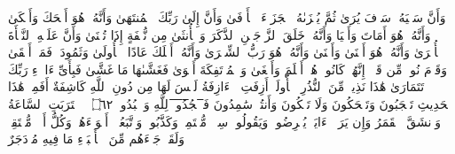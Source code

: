 \stopbuffer%
\startbuffer[\q:53:40]
وَأَنَّ سَعۡیَهُۥ سَوۡفَ یُرَىٰ%
\stopbuffer%
\startbuffer[\q:53:41]
ثُمَّ یُجۡزَىٰهُ ٱلۡجَزَاۤءَ ٱلۡأَوۡفَىٰ%
\stopbuffer%
\startbuffer[\q:53:42]
وَأَنَّ إِلَىٰ رَبِّكَ ٱلۡمُنتَهَىٰ%
\stopbuffer%
\startbuffer[\q:53:43]
وَأَنَّهُۥ هُوَ أَضۡحَكَ وَأَبۡكَىٰ%
\stopbuffer%
\startbuffer[\q:53:44]
وَأَنَّهُۥ هُوَ أَمَاتَ وَأَحۡیَا%
\stopbuffer%
\startbuffer[\q:53:45]
وَأَنَّهُۥ خَلَقَ ٱلزَّوۡجَیۡنِ ٱلذَّكَرَ وَٱلۡأُنثَىٰ%
\stopbuffer%
\startbuffer[\q:53:46]
مِن نُّطۡفَةٍ إِذَا تُمۡنَىٰ%
\stopbuffer%
\startbuffer[\q:53:47]
وَأَنَّ عَلَیۡهِ ٱلنَّشۡأَةَ ٱلۡأُخۡرَىٰ%
\stopbuffer%
\startbuffer[\q:53:48]
وَأَنَّهُۥ هُوَ أَغۡنَىٰ وَأَقۡنَىٰ%
\stopbuffer%
\startbuffer[\q:53:49]
وَأَنَّهُۥ هُوَ رَبُّ ٱلشِّعۡرَىٰ%
\stopbuffer%
\startbuffer[\q:53:50]
وَأَنَّهُۥۤ أَهۡلَكَ عَادًا ٱلۡأُولَىٰ%
\stopbuffer%
\startbuffer[\q:53:51]
وَثَمُودَا۟ فَمَاۤ أَبۡقَىٰ%
\stopbuffer%
\startbuffer[\q:53:52]
وَقَوۡمَ نُوحࣲ مِّن قَبۡلُۖ إِنَّهُمۡ كَانُوا۟ هُمۡ أَظۡلَمَ وَأَطۡغَىٰ%
\stopbuffer%
\startbuffer[\q:53:53]
وَٱلۡمُؤۡتَفِكَةَ أَهۡوَىٰ%
\stopbuffer%
\startbuffer[\q:53:54]
فَغَشَّىٰهَا مَا غَشَّىٰ%
\stopbuffer%
\startbuffer[\q:53:55]
فَبِأَیِّ ءَالَاۤءِ رَبِّكَ تَتَمَارَىٰ%
\stopbuffer%
\startbuffer[\q:53:56]
هَٰذَا نَذِیرࣱ مِّنَ ٱلنُّذُرِ ٱلۡأُولَىٰۤ%
\stopbuffer%
\startbuffer[\q:53:57]
أَزِفَتِ ٱلۡءَازِفَةُ%
\stopbuffer%
\startbuffer[\q:53:58]
لَیۡسَ لَهَا مِن دُونِ ٱللَّهِ كَاشِفَةٌ%
\stopbuffer%
\startbuffer[\q:53:59]
أَفَمِنۡ هَٰذَا ٱلۡحَدِیثِ تَعۡجَبُونَ%
\stopbuffer%
\startbuffer[\q:53:60]
وَتَضۡحَكُونَ وَلَا تَبۡكُونَ%
\stopbuffer%
\startbuffer[\q:53:61]
وَأَنتُمۡ سَٰمِدُونَ%
\stopbuffer%
\startbuffer[\q:53:62]
فَ̅ٱ̅سۡ̅جُ̅دُ̅و̅ا۟̅ لِلَّهِ وَٱعۡبُدُوا۟ ۝٦٢ ۩%
\stopbuffer%
\startbuffer[\q:54:1]
ٱقۡتَرَبَتِ ٱلسَّاعَةُ وَٱنشَقَّ ٱلۡقَمَرُ%
\stopbuffer%
\startbuffer[\q:54:2]
وَإِن یَرَوۡا۟ ءَایَةࣰ یُعۡرِضُوا۟ وَیَقُولُوا۟ سِحۡرࣱ مُّسۡتَمِرࣱّ%
\stopbuffer%
\startbuffer[\q:54:3]
وَكَذَّبُوا۟ وَٱتَّبَعُوۤا۟ أَهۡوَاۤءَهُمۡۚ وَكُلُّ أَمۡرࣲ مُّسۡتَقِرࣱّ%
\stopbuffer%
\startbuffer[\q:54:4]
وَلَقَدۡ جَاۤءَهُم مِّنَ ٱلۡأَنۢبَاۤءِ مَا فِیهِ مُزۡدَجَرٌ%
\stopbuffer%
